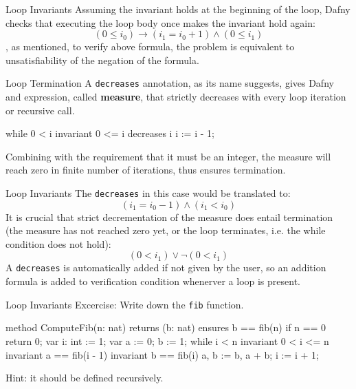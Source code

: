 \documentclass[10pt, compress]{beamer}
\begin{document}
\begin{frame}[fragile]{Loop Invariants}
Assuming the invariant holds at the beginning of the loop, Dafny checks that executing the loop body once makes the invariant hold again:
    $$(0 \leq i_0) \to (i_1 = i_0 + 1) \land (0 \leq i_1)$$
, as mentioned, to verify above formula, the problem is equivalent to unsatisfiability of the negation of the formula.

\end{frame}

\begin{frame}[fragile]{Loop Termination}
  A \verb|decreases| annotation, as its name suggests, gives Dafny and expression, called \textbf{measure}, that strictly decreases with every loop iteration or recursive call.
  \begin{verbnobox}[\footnotesize]
while 0 < i
   invariant 0 <= i
   decreases i
{
   i := i - 1;
}
  \end{verbnobox}
Combining with the requirement that it must be an integer, the measure will reach zero in finite number of iterations, thus ensures termination.
\end{frame}

\begin{frame}[fragile]{Loop Invariants}
The \verb|decreases| in this case would be translated to:
  $$(i_1 = i_0 - 1) \land (i_1 < i_0)$$
It is crucial that strict decrementation of the measure does entail termination (the measure has not reached zero yet, or the loop terminates, i.e. the while condition does not hold):
  $$(0 < i_1) \lor \neg(0 < i_1) $$
A \verb|decreases| is automatically added if not given by the user, so an addition formula is added to verification condition whenerver a loop is present.
\end{frame}

\begin{frame}[fragile]{Loop Invariants}
  Excercise: Write down the \verb|fib| function.
  \begin{verbnobox}[\footnotesize]
method ComputeFib(n: nat) returns (b: nat)
   ensures b == fib(n)
{
   if n == 0 { return 0; }
   var i: int := 1;
   var a := 0;
       b := 1;
   while i < n
      invariant 0 < i <= n
      invariant a == fib(i - 1)
      invariant b == fib(i)
   {
      a, b := b, a + b;
      i := i + 1;
   }
}
  \end{verbnobox}
  Hint: it should be defined recursively.
\end{frame}
\end{document}
